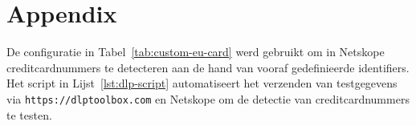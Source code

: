 
\chapter{Appendix}
\label{app:appendix}

De configuratie in Tabel~\ref{tab:custom-eu-card} werd gebruikt om in Netskope creditcardnummers te detecteren aan de hand van vooraf gedefinieerde identifiers.  
Het script in Lijst~\ref{lst:dlp-script} automatiseert het verzenden van testgegevens via \texttt{https://dlptoolbox.com} en Netskope om de detectie van creditcardnummers te testen.


